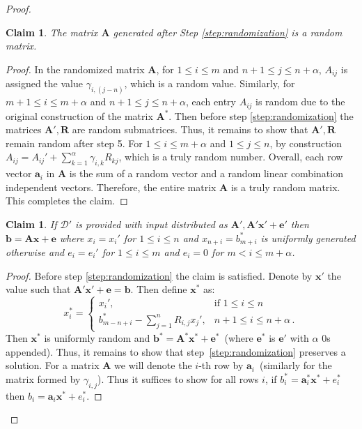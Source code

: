 \documentclass[11pt]{article}
\newcommand{\vect}[1]{\ensuremath{\textbf{#1}}}
\newcommand{\D}{\mathcal{D}}
\newtheorem{claim}[theorem]{Claim}
\newcommand{\ve}{\vect{e}}
\newcommand{\vA}{\vect{A}}
\newcommand{\vx}{\vect{x}}
\newcommand{\va}{\vect{a}}
\newcommand{\vb}{\vect{b}}
\begin{document}
\begin{proof}
\begin{claim}
\label{cl:randomMatrixDist}
The matrix $\vA$ generated after Step \ref{step:randomization} is a random matrix.
\end{claim}
\begin{proof}
In the randomized matrix $\vect{A}$, for $1\le i \le m$ and $n+1\le j \le n+\alpha$, $A_{ij}$ is assigned the value $\gamma_{i,(j - n)}$, which is a random value.  Similarly, for $m+1\le i \le m+\alpha$ and $n+1\le j \le n+\alpha$, each entry $A_{ij}$ is random due to the original construction of the matrix $\vA^*$.  Then before step \ref{step:randomization} the matrices $\vA', \vect{R}$ are random submatrices.  Thus, it remains to show that $\vA', \vect{R}$ remain random after step 5. For $1\le i \le m+\alpha$ and $1\le j \le n$, by construction $A_{ij} = A_{ij}'+\sum_{k=1}^\alpha \gamma_{i, k} R_{kj}$, which is a truly random number. Overall, each row vector $\va_{i}$ in $\vA$ is the sum of a random vector and a random linear combination independent vectors. Therefore, the entire matrix $\vA$ is a truly random matrix.  This completes the claim.
\end{proof}
\begin{claim}
\label{cl:random ax+e}
If $\D'$ is provided with input distributed as $\vA', \vA'\vx'+\ve'$ then $\vb = \vA \vx+\ve$ where $x_i = x_i'$ for $1\leq i \leq n$ and $x_{n+i} = b_{m+i}^*$ is uniformly generated otherwise and  $e_i = e_i'$ for $1\leq i\leq m$ and $e_i = 0$ for $m<i\leq m+\alpha$.
\end{claim}
\begin{proof}
Before step \ref{step:randomization} the claim is satisfied.  Denote by $\vx'$ the value such that $\vA'\vx'+\ve = \vb$.  
Then define $\vx^*$ as:
\[
x^*_i = \begin{cases}
x_i', & \text{if }1\leq i\leq n \\
b_{m-n+i}^*-\sum_{j=1}^n R_{i, j} x_j', & n+1\leq i\leq n+\alpha\,.
\end{cases}
\]
Then $\vx^*$ is uniformly random and $\vb^* = \vA^*\vx^* + \ve^*$~(where $\ve^*$ is $\ve'$ with $\alpha$ 0s appended).  Thus, it remains to show that step~\ref{step:randomization} preserves a solution.
For a matrix $\vA$ we will denote the $i$-th row by $\va_i$~(similarly for the matrix formed by $\gamma_{i,j}$).  Thus it suffices to show for all rows $i$, if $b_i^* = \va^*_i \vx^*+e^*_i$  then $b_i = \va_i \vx^* + e^*_i$.

\end{proof}
\end{proof}
\end{document}
